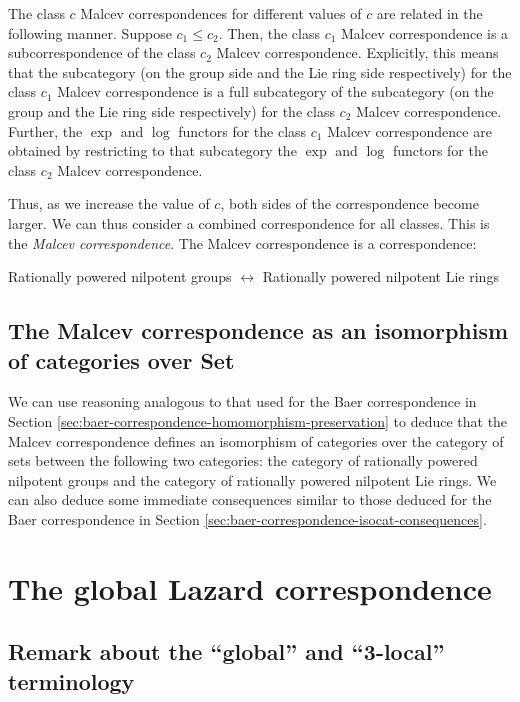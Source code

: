 The class $c$ Malcev correspondences for different values of $c$ are
related in the following manner. Suppose $c_1 \le c_2$. Then, the
class $c_1$ Malcev correspondence is a subcorrespondence of the class
$c_2$ Malcev correspondence. Explicitly, this means that the
subcategory (on the group side and the Lie ring side respectively) for
the class $c_1$ Malcev correspondence is a full subcategory of the
subcategory (on the group and the Lie ring side respectively) for the
class $c_2$ Malcev correspondence. Further, the $\exp$ and $\log$
functors for the class $c_1$ Malcev correspondence are obtained by
restricting to that subcategory the $\exp$ and $\log$ functors for the
class $c_2$ Malcev correspondence.

Thus, as we increase the value of $c$, both sides of the
correspondence become larger. We can thus consider a combined
correspondence for all classes. This is the {\em Malcev
  correspondence}. The Malcev correspondence is a correspondence:

\begin{center}
  Rationally powered nilpotent groups $\leftrightarrow$ Rationally
  powered nilpotent Lie rings
\end{center}
\subsection{The Malcev correspondence as an isomorphism of categories over Set}

We can use reasoning analogous to that used for the Baer
correspondence in Section
\ref{sec:baer-correspondence-homomorphism-preservation} to deduce that
the Malcev correspondence defines an isomorphism of categories over
the category of sets between the following two categories: the
category of rationally powered nilpotent groups and the category of
rationally powered nilpotent Lie rings. We can also deduce some
immediate consequences similar to those deduced for the Baer
correspondence in Section
\ref{sec:baer-correspondence-isocat-consequences}.


\section{The global Lazard correspondence}\label{sec:global-lazard-correspondence}

\subsection*{Remark about the ``global'' and ``3-local'' terminology}

